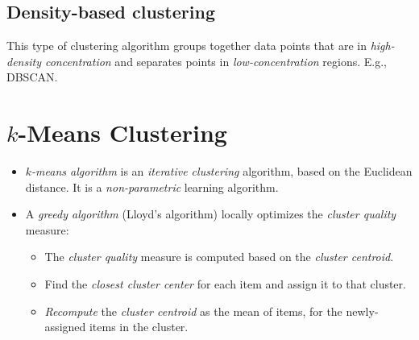 \documentclass[
	number={6},
	title={Clustering}
]{cs584notes}
\begin{document}
\subsection{Density-based clustering}\label{subsec:density-based-clustering}
This type of clustering algorithm groups together data points that are in \emph{high-density concentration} and separates points in \emph{low-concentration} regions.
E.g., DBSCAN\@.

\section{$k$-Means Clustering}\label{sec:k-means-clustering}
\begin{itemize}
	\item \emph{$k$-means algorithm} is an \emph{iterative clustering} algorithm, based on the Euclidean distance.
	It is a \emph{non-parametric} learning algorithm.
	\item A \emph{greedy algorithm} (Lloyd's algorithm) locally optimizes the \emph{cluster quality} measure:
	\begin{itemize}
		\item The \emph{cluster quality} measure is computed based on the \emph{cluster centroid}.
		\item Find the \emph{closest cluster center} for each item and assign it to that cluster.
		\item \emph{Recompute} the \emph{cluster centroid} as the mean of items, for the newly-assigned items in the cluster.
	\end{itemize}
\end{itemize}

\end{document}
